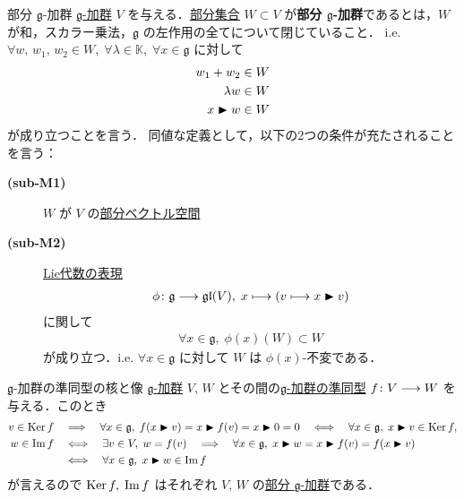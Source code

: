 \documentclass[rep_main]{subfiles}
\begin{document}
\begin{mydef}[label=def:sub-g-module,breakable]{部分 $\mathfrak{g}$-加群}
	\hyperref[ax:g-module]{ $\mathfrak{g}$-加群} $V$ を与える．\underline{部分集合} $W \subset V$ が\textbf{部分 $\bm{\mathfrak{g}}$-加群}であるとは，$W$ が和，スカラー乗法，$\mathfrak{g}$ の左作用の全てについて閉じていること．
	i.e. $\forall w,\, w_1,\, w_2 \in W,\; \forall \lambda \in \mathbb{K},\; \forall x \in \mathfrak{g}$ に対して
	\begin{align}
		w_1 + w_2 &\in W \\
		\lambda w &\in W \\
		x \blacktriangleright w &\in W
	\end{align}
	が成り立つことを言う．
	\tcblower
	同値な定義として，以下の2つの条件が充たされることを言う：
	\begin{description}
		\item[\textbf{(sub-M1)}] $W$ が $V$ の\underline{部分ベクトル空間}
		\item[\textbf{(sub-M2)}] \hyperref[def:rep-LieAlg]{Lie代数の表現}
		\begin{align}
			\phi \colon \mathfrak{g} \longrightarrow \mathfrak{gl}(V),\; x \longmapsto (v \longmapsto x \blacktriangleright v)
		\end{align}
		に関して
		\begin{align}
			\forall x \in \mathfrak{g},\; \phi(x)(W) \subset W
		\end{align}
		が成り立つ．i.e. $\forall x \in \mathfrak{g}$ に対して $W$ は $\phi(x)$-不変である．
	\end{description}
\end{mydef}

\begin{myexample}[label=ex:gmod-Ker-Im]{$\mathfrak{g}$-加群の準同型の核と像}
	\hyperref[ax:g-module]{$\mathfrak{g}$-加群} $V,\, W$ とその間の\hyperref[def:g-module-hom]{$\mathfrak{g}$-加群の準同型} $f \colon V \longrightarrow W$ を与える．このとき
	\begin{align}
		v \in \operatorname{Ker} f &\quad \Longrightarrow \quad \forall x \in \mathfrak{g},\; f(x \blacktriangleright v) = x \blacktriangleright f(v) = x \blacktriangleright 0 = 0 \quad \Longleftrightarrow \quad \forall x \in \mathfrak{g},\; x \blacktriangleright v \in \operatorname{Ker} f, \\
		w \in \Im f &\quad \Longleftrightarrow \quad \exists v \in V,\; w = f(v) \quad \Longrightarrow \quad \forall x \in \mathfrak{g},\; x \blacktriangleright w = x \blacktriangleright f(v) = f(x \blacktriangleright v) \\
		&\quad \Longleftrightarrow \quad \forall x \in \mathfrak{g},\; x \blacktriangleright w \in \Im f
	\end{align}
	が言えるので $\operatorname{Ker} f,\; \Im f$ はそれぞれ $V,\, W$ の\hyperref[def:sub-g-module]{部分 $\mathfrak{g}$-加群}である．
\end{myexample}
\end{document}
